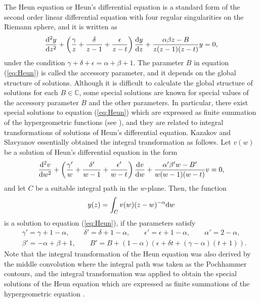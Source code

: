 \documentclass[12pt]{amsart}
\numberwithin{equation}{section}
\theoremstyle{definition}
\theoremstyle{remark}
\begin{document}
The Heun equation or Heun's differential equation is a standard form of the second order linear differential equation with four regular singularities on the Riemann sphere, and it is written as 
\begin{align}
  \frac{{\rm d}^{2}y}{{\rm d}z^{2}} + \left(\frac{\gamma}{z} + \frac{\delta}{z - 1} + \frac{\epsilon}{z - t} \right) \frac{{\rm d}y}{{\rm d}z} + \frac{\alpha \beta z - B}{z(z - 1)(z - t)}y = 0, \label{eq:Heun}
\end{align}
under the condition $\gamma + \delta + \epsilon = \alpha + \beta + 1$.
The parameter $B$ in equation (\ref{eq:Heun}) is called the accessory parameter, and it depends on the global structure of solutions.
Although it is difficult to calculate the global structure of solutions for each $B \in \mathbb{C}$, some special solutions are known for special values of the accessory parameter $B$ and the other parameters.
In particular, there exist special solutions to equation (\ref{eq:Heun}) which are expressed as finite summation of the hypergeometric functions (see \cite{TakIT}), and they are related to integral transformations of solutions of Heun's differential equation.
Kazakov and Slavyanov \cite{KS} essentially obtained the integral transformation as follows.
Let $v(w)$ be a solution of Heun's differential equation in the form
\begin{align*}
  \frac{{\rm d}^2 v}{{\rm d}w^2} + \left( \frac{\gamma '}{w}+\frac{\delta '}{w-1}+\frac{\epsilon '}{w-t}\right) \frac{{\rm d}v}{{\rm d}w} + \frac{\alpha ' \beta ' w -B '}{w(w - 1)(w - t)} v = 0 ,
\end{align*}
and let $C$ be a suitable integral path in the $w$-plane.
Then, the function
\begin{align*}
  y(z)=\int _{C} v(w) (z-w)^{-\alpha } {\rm d}w
\end{align*}
is a solution to equation (\ref{eq:Heun}), if the parameters satisfy
\begin{align*}
  &\gamma '=\gamma +1 -\alpha , \qquad \delta' =\delta +1-\alpha , \qquad \epsilon '=\epsilon +1-\alpha , \qquad \alpha '=2-\alpha , \\
  &\beta '= -\alpha +\beta +1 ,\qquad B'=B+(1-\alpha )(\epsilon +\delta t+(\gamma -\alpha ) (t+1)).
\end{align*}
Note that the integral transformation of the Heun equation was also derived by the middle convolution \cite{TakI,TakM} where the integral path was taken as the Pochhammer contours, and the integral transformation was applied to obtain the special solutions of the Heun equation which are expressed as finite summations of the hypergeometric equation \cite{TakIT}.
\end{document}

